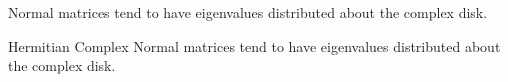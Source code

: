 Normal matrices tend to have eigenvalues distributed about the complex disk.

\newpage

Hermitian Complex Normal matrices tend to have eigenvalues distributed about the complex disk.

\newpage
